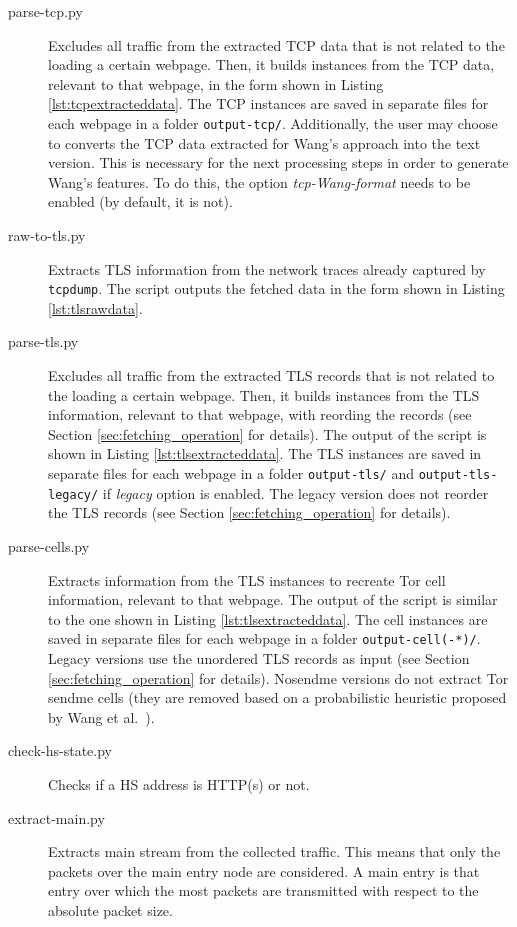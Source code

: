 \begin{description}
\begin{description}
\item[parse-tcp.py] Excludes all traffic from the extracted \ac{TCP} data that is not related to the loading a certain webpage. Then, it builds instances from the \ac{TCP} data, relevant to that webpage, in the form shown in Listing \ref{lst:tcpextracteddata}. The \ac{TCP} instances are saved in separate files for each webpage in a folder \texttt{output-tcp/}. Additionally, the user may choose to converts the \ac{TCP} data extracted for Wang's approach into the text version. This is necessary for the next processing steps in order to generate Wang's features. To do this, the option \emph{tcp-Wang-format} needs to be enabled (by default, it is not).
\item[raw-to-tls.py] Extracts \ac{TLS} information from the network traces already captured by \texttt{tcpdump}. The script outputs the fetched data in the form shown in Listing \ref{lst:tlsrawdata}.
\item[parse-tls.py] Excludes all traffic from the extracted \ac{TLS} records that is not related to the loading a certain webpage. Then, it builds instances from the \ac{TLS} information, relevant to that webpage, with reording the records (see Section \ref{sec:fetching_operation} for details). The output of the script is shown in Listing \ref{lst:tlsextracteddata}. The \ac{TLS} instances are saved in separate files for each webpage in a folder \texttt{output-tls/} and \texttt{output-tls-legacy/} if \emph{legacy} option is enabled. The legacy version does not reorder the \ac{TLS} records (see Section \ref{sec:fetching_operation} for details).
\item[parse-cells.py] Extracts information from the \ac{TLS} instances to recreate Tor cell information, relevant to that webpage. The output of the script is similar to the one shown in Listing \ref{lst:tlsextracteddata}. The cell instances are saved in separate files for each webpage in a folder \texttt{output-cell(-*)/}. Legacy versions use the unordered \ac{TLS} records as input (see Section \ref{sec:fetching_operation} for details). Nosendme versions do not extract Tor sendme cells (they are removed based on a probabilistic heuristic proposed by Wang et al.~\cite{Wang2014}).
\item[check-hs-state.py] Checks if a \acs{HS} address is \acs{HTTP}(s) or not.
\item[extract-main.py] Extracts main stream from the collected traffic. This means that only the packets over the main entry node are considered. A main entry is that entry over which the most packets are transmitted with respect to the absolute packet size.

\end{description}
\end{description}
